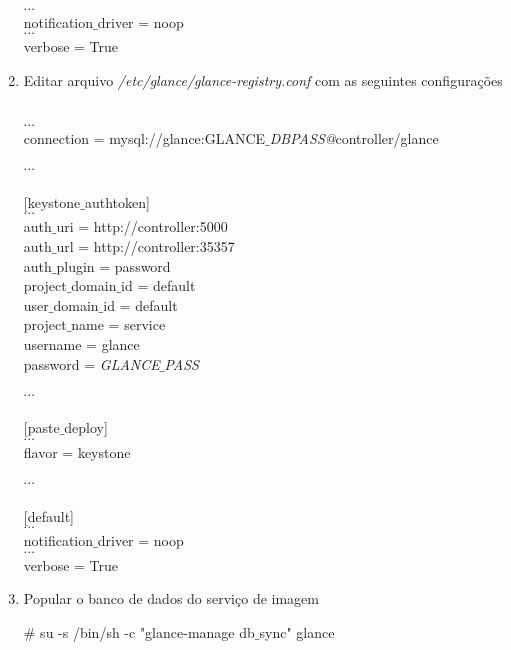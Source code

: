 \begin{enumerate}
\begin{snugshade}
				[default] \\
				$\cdots$ \\
				notification$\_$driver = noop \\
				$\cdots$ \\
				verbose = True
			\end{snugshade}
			
		\item Editar arquivo \emph{/etc/glance/glance-registry.conf} com as seguintes configurações
			\begin{snugshade}
				[database] \\
				$\cdots$ \\
				connection = mysql://glance:GLANCE$\_$\emph{DBPASS@}controller/glance \\ \\
				$\cdots$ \\ \\
				
				[keystone$\_$authtoken] \\
				$\cdots$ \\
				auth$\_$uri = http://controller:5000 \\
				auth$\_$url = http://controller:35357 \\
				auth$\_$plugin = password \\
				project$\_$domain$\_$id = default \\
				user$\_$domain$\_$id = default \\
				project$\_$name = service \\				
				username = glance \\
				password = \emph{GLANCE$\_$PASS}\\ \\
				$\cdots$ \\ \\
				
				[paste$\_$deploy]\\
				$\cdots$ \\
				flavor = keystone \\ \\
				$\cdots$ \\ \\
				
				[default] \\
				$\cdots$ \\
				notification$\_$driver = noop \\
				$\cdots$ \\
				verbose = True
			\end{snugshade}		

		\item Popular o banco de dados do serviço de imagem
			\begin{snugshade}
			\# su -s /bin/sh -c "glance-manage db$\_$sync" glance
			\end{snugshade}		
	\end{enumerate}
	
